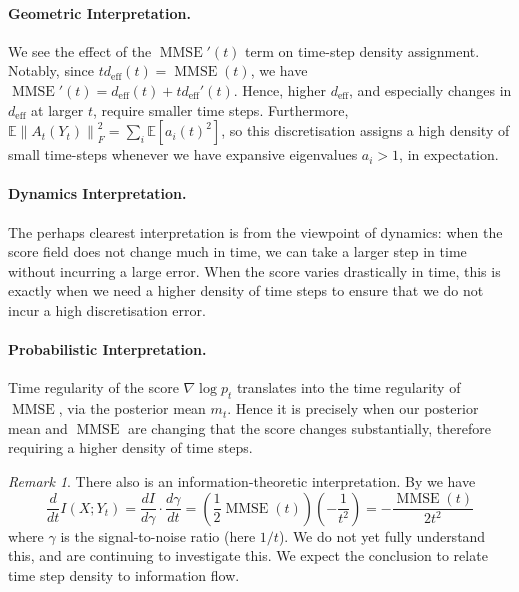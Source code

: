 \documentclass{article}
\DeclareMathOperator{\mmse}{MMSE}
\newcommand{\E}{\mathbb{E}}
\theoremstyle{plain}
\theoremstyle{definition}
\theoremstyle{remark}
\newtheorem{remark}[theorem]{Remark}
\begin{document}
\paragraph{Geometric Interpretation.} We see the effect of the $\operatorname{MMSE}'(t)$ term on time-step density assignment. Notably, since $t d_{\text{eff}}(t) = \operatorname{MMSE}(t)$, we have $\operatorname{MMSE}'(t) = d_{\text{eff}}(t) + t d_{\text{eff}}'(t)$. Hence, higher $d_{\text{eff}}$, and especially changes in $d_{\text{eff}}$ at larger $t$, require smaller time steps. Furthermore, $\mathbb{E}\left\|A_t\left(Y_t\right)\right\|_F^2 = \sum_i \E\left[a_i(t)^2 \right]$, so this discretisation assigns a high density of small time-steps whenever we have expansive eigenvalues $a_i>1$, in expectation. 

\paragraph{Dynamics Interpretation.} The perhaps clearest interpretation is from the viewpoint of dynamics: when the score field does not change much in time, we can take a larger step in time without incurring a large error. When the score varies drastically in time, this is exactly when we need a higher density of time steps to ensure that we do not incur a high discretisation error.

\paragraph{Probabilistic Interpretation.} Time regularity of the score $\nabla \log p_t$ translates into the time regularity of $\mmse$, via the posterior mean $m_t$. Hence it is precisely when our posterior mean and $\mmse$ are changing that the score changes substantially, therefore requiring a higher density of time steps.

\begin{remark}
    There also is an information-theoretic interpretation. By \citep{guo2005mutual} we have \[\frac{d}{d t} I\left(X ; Y_t\right)=\frac{d I}{d \gamma} \cdot \frac{d \gamma}{d t}=\left(\frac{1}{2}\operatorname{MMSE}(t)\right)\left(-\frac{1}{t^2}\right)=-\frac{\operatorname{MMSE}(t)}{2t^2}\] where $\gamma$ is the signal-to-noise ratio (here $1/t$). We do not yet fully understand this, and are continuing to investigate this. We expect the conclusion to relate time step density to information flow.
\end{remark}
\end{document}
